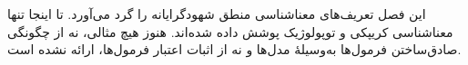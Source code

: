 \documentclass[../../../include/open-logic-chapter]{subfiles}
\begin{document}

\begin{editorial}
  این فصل تعریف‌های معناشناسی منطق شهودگرایانه را گرد می‌آورد. تا اینجا
  تنها معناشناسی کریپکی و توپولوژیک پوشش داده شده‌اند. هنوز هیچ مثالی،
  نه از چگونگی صادق‌ساختن فرمول‌ها به‌وسیلهٔ مدل‌ها و نه از اثبات اعتبار
  فرمول‌ها، ارائه نشده است.
\end{editorial}


\OLEndChapterHook
\end{document}
